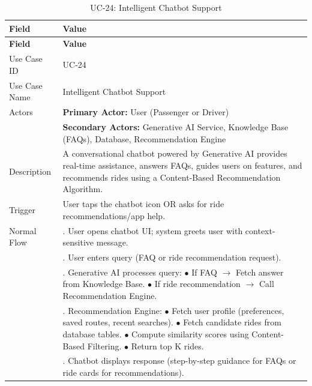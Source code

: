 \begin{longtable}{|>{\raggedright\arraybackslash}p{4cm}|>{\raggedright\arraybackslash}p{11cm}|}
\caption{UC-24: Intelligent Chatbot Support}
\label{tab:uc-24} \\
\hline
\rowcolor{lightgray!30}
\textbf{Field} & \textbf{Value} \\
\hline
\endfirsthead
\hline
\rowcolor{lightgray!30}
\textbf{Field} & \textbf{Value} \\
\hline
\endhead
\hline
\endfoot
\hline
\endlastfoot
Use Case ID & UC-24 \\
\hline
Use Case Name & Intelligent Chatbot Support \\
\hline
Actors & \textbf{Primary Actor:} User (Passenger or Driver) \\
& \textbf{Secondary Actors:} Generative AI Service, Knowledge Base (FAQs), Database, Recommendation Engine \\
\hline
Description & A conversational chatbot powered by Generative AI provides real-time assistance, answers FAQs, guides users on features, and recommends rides using a Content-Based Recommendation Algorithm. \\
\hline
Trigger & User taps the chatbot icon OR asks for ride recommendations/app help. \\
\hline
Normal Flow & 1. User opens chatbot UI; system greets user with context-sensitive message. \\
& 2. User enters query (FAQ or ride recommendation request). \\
& 3. Generative AI processes query: \newline $\bullet$ If FAQ $\rightarrow$ Fetch answer from Knowledge Base. \newline $\bullet$ If ride recommendation $\rightarrow$ Call Recommendation Engine. \\
& 4. Recommendation Engine: \newline $\bullet$ Fetch user profile (preferences, saved routes, recent searches). \newline $\bullet$ Fetch candidate rides from database tables. \newline $\bullet$ Compute similarity scores using Content-Based Filtering. \newline $\bullet$ Return top K rides. \\
& 5. Chatbot displays response (step-by-step guidance for FAQs or ride cards for recommendations). \\

\end{longtable}
